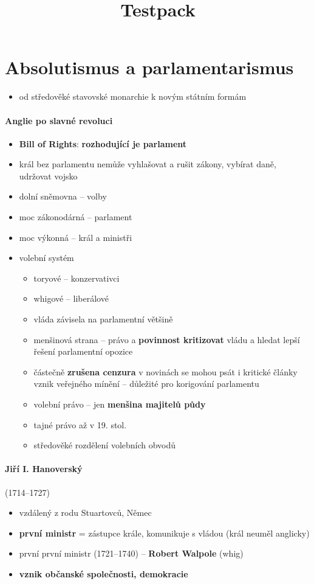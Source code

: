 \title{Testpack}



\section{Absolutismus a parlamentarismus}
\begin{itemize}
\item od středověké stavovské monarchie k novým státním formám
\end{itemize}

\paragraph{Anglie po slavné revoluci}
\begin{itemize}
\item \textbf{Bill of Rights}: \textbf{rozhodující je parlament}
\item král bez parlamentu nemůže vyhlašovat a rušit zákony, vybírat daně, udržovat vojsko
\item dolní sněmovna -- volby
\item moc zákonodárná -- parlament
\item moc výkonná -- král a ministři
\item volební systém
	\begin{itemize}
	\item toryové -- konzervativci
	\item whigové -- liberálové
	\item vláda závisela na parlamentní většině
	\item menšinová strana -- právo a \textbf{povinnost kritizovat} vládu a hledat lepší řešení \ra parlamentní opozice
	\item částečně \textbf{zrušena cenzura} \ra v novinách se mohou psát i kritické články \ra vznik veřejného mínění  -- důležité pro korigování parlamentu
	\item volební právo -- jen \textbf{menšina majitelů půdy}
	\item tajné právo až v 19. stol.
	\item středověké rozdělení volebních obvodů
	\end{itemize}
\end{itemize}


\paragraph{Jiří I. Hanoverský}(1714--1727)
\begin{itemize}
\item vzdálený z rodu Stuartovců, Němec
\item \textbf{první ministr} = zástupce krále, komunikuje s vládou (král neuměl anglicky)
\item první první ministr (1721--1740) -- \textbf{Robert Walpole} (whig) 
\item \textbf{vznik občanské společnosti, demokracie}
\end{itemize}



